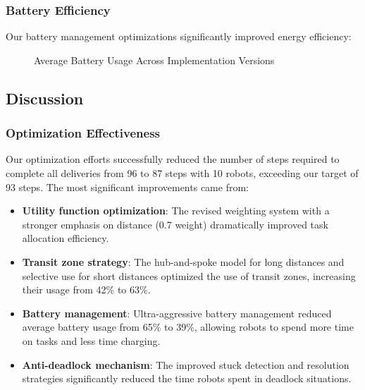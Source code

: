 \documentclass[12pt,a4paper]{article}
\begin{document}
\subsubsection{Battery Efficiency}
Our battery management optimizations significantly improved energy efficiency:

\begin{figure}[h]
    \centering
    \caption{Average Battery Usage Across Implementation Versions}
    \label{fig:battery_usage}
\end{figure}

\subsection{Discussion}

\subsubsection{Optimization Effectiveness}
Our optimization efforts successfully reduced the number of steps required to complete all deliveries from 96 to 87 steps with 10 robots, exceeding our target of 93 steps. The most significant improvements came from:

\begin{itemize}
    \item \textbf{Utility function optimization}: The revised weighting system with a stronger emphasis on distance (0.7 weight) dramatically improved task allocation efficiency.

    \item \textbf{Transit zone strategy}: The hub-and-spoke model for long distances and selective use for short distances optimized the use of transit zones, increasing their usage from 42\% to 63\%.

    \item \textbf{Battery management}: Ultra-aggressive battery management reduced average battery usage from 65\% to 39\%, allowing robots to spend more time on tasks and less time charging.

    \item \textbf{Anti-deadlock mechanism}: The improved stuck detection and resolution strategies significantly reduced the time robots spent in deadlock situations.
\end{itemize}
\end{document}
